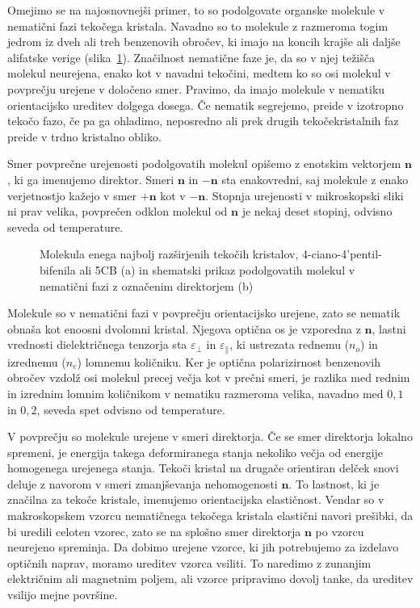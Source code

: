 Omejimo se na najosnovnejši
primer, to so podolgovate organske molekule v nematični fazi tekočega kristala. 
Navadno so to molekule z razmeroma togim jedrom iz
dveh ali treh benzenovih obročev, ki imajo na koncih krajše ali daljše
alifatske verige (slika~\ref{fig:5CB}). Značilnost nematične faze je, da
so v njej težišča molekul neurejena, enako kot v navadni tekočini, medtem ko so 
osi molekul v povprečju urejene v določeno smer. Pravimo, da imajo molekule
v nematiku orientacijsko ureditev dolgega dosega. Če nematik segrejemo,
preide v izotropno tekočo fazo, če pa ga ohladimo, neposredno ali prek drugih
tekočekristalnih faz preide v trdno kristalno obliko. 

Smer povprečne urejenosti podolgovatih molekul opišemo z enotskim vektorjem 
$\mathbf{n}$, ki ga imenujemo direktor. 
Smeri $\mathbf{n}$ in $-\mathbf{n}$ sta 
enakovredni, saj molekule z enako verjetnostjo kažejo v smer $+\mathbf{n}$ kot 
v $-\mathbf{n}$. Stopnja urejenosti v mikroskopski sliki ni prav velika, povprečen
odklon molekul od $\mathbf{n}$ je nekaj deset stopinj, odvisno seveda od temperature.
\begin{figure}[ht]
\centering
\def\svgwidth{100truemm}

\caption{Molekula enega najbolj razširjenih tekočih kristalov, 4-ciano-4'pentil-bifenila 
ali 5CB (a) in shematski prikaz podolgovatih molekul v nematični fazi z označenim direktorjem (b)}
\label{fig:5CB}
\end{figure}

Molekule so v nematični fazi v povprečju orientacijsko urejene, zato se nematik
obnaša kot enoosni dvolomni kristal. Njegova optična os je vzporedna 
z $\mathbf{n}$, lastni vrednosti dielektričnega tenzorja sta $\varepsilon_\bot$ in
$\varepsilon_{\parallel}$, ki ustrezata rednemu ($n_o$) in izrednemu ($n_e$) 
lomnemu količniku.
Ker je optična polarizirnost benzenovih obročev vzdolž osi molekul precej večja kot
v prečni smeri, je razlika med rednim in izrednim lomnim količnikom v nematiku razmeroma 
velika, navadno med $0,1$ in $0,2$, seveda spet odvisno od temperature.

V povprečju so molekule urejene v smeri direktorja. Če se smer direktorja lokalno
spremeni, je energija takega deformiranega 
stanja nekoliko večja od energije homogenega urejenega stanja. Tekoči kristal na
drugače orientiran delček snovi deluje z navorom v smeri zmanjševanja 
nehomogenosti $\mathbf{n}$. To lastnost, ki je značilna za tekoče kristale,
imenujemo orientacijska elastičnost. Vendar so v makroskopskem vzorcu
nematičnega tekočega kristala elastični navori prešibki,
da bi uredili celoten vzorec, zato se na splošno smer direktorja $\mathbf{n}$ 
po vzorcu neurejeno spreminja. Da dobimo urejene vzorce, ki jih potrebujemo za izdelavo
optičnih naprav, moramo ureditev vzorca 
vsiliti. To naredimo z zunanjim električnim ali magnetnim poljem, 
ali vzorce pripravimo dovolj tanke, da ureditev vsilijo mejne površine. 


